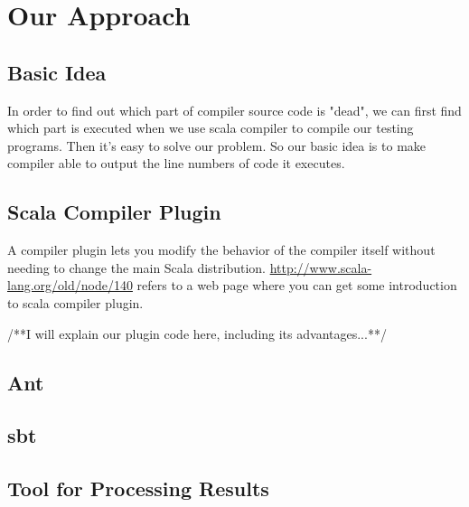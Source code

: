 \documentclass[a4paper]{article}
\begin{document}
\section{Our Approach}
\subsection{Basic Idea}
In order to find out which part of compiler source code is "dead", we can first find which part is executed when we use scala compiler to compile our testing programs. Then it's easy to solve our problem. So our basic idea is to make compiler able to output the line numbers of code it executes. 

\subsection{Scala Compiler Plugin}
A compiler plugin lets you modify the behavior of the compiler itself without needing to change the main Scala distribution. \url{http://www.scala-lang.org/old/node/140} refers to a web page where you can get some introduction to scala compiler plugin.

/**I will explain our plugin code here, including its advantages...**/

\subsection{Ant}

\subsection{sbt}

\subsection{Tool for Processing Results}
\end{document}
